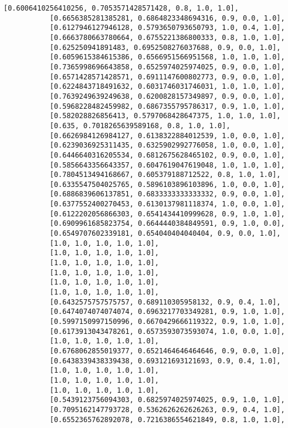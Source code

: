 \documentclass[11pt]{article}
\begin{document}
\begin{Verbatim}[commandchars=\\\{\}]
           [0.6006410256410256, 0.7053571428571428, 0.8, 1.0, 1.0],
           [0.6656385281385281, 0.6864823348694316, 0.9, 0.0, 1.0],
           [0.6127946127946128, 0.5793650793650793, 1.0, 0.4, 1.0],
           [0.6663780663780664, 0.6755221386800333, 0.8, 1.0, 1.0],
           [0.625250941891483, 0.6952508276037688, 0.9, 0.0, 1.0],
           [0.6059615384615386, 0.6566951566951568, 1.0, 1.0, 1.0],
           [0.7365998696643858, 0.6525974025974025, 0.9, 0.0, 1.0],
           [0.6571428571428571, 0.6911147600802773, 0.9, 0.0, 1.0],
           [0.6224843718491632, 0.6031746031746031, 1.0, 1.0, 1.0],
           [0.7639249639249638, 0.6200828157349897, 0.9, 0.0, 1.0],
           [0.5968228482459982, 0.6867355795786317, 0.9, 1.0, 1.0],
           [0.582028826856413, 0.5797068428647375, 1.0, 1.0, 1.0],
           [0.635, 0.7018265639589168, 0.8, 1.0, 1.0],
           [0.6626984126984127, 0.6138322884012539, 1.0, 0.0, 1.0],
           [0.6239036925311435, 0.6325902992776058, 1.0, 0.0, 1.0],
           [0.6446640316205534, 0.6812675628465102, 0.9, 0.0, 1.0],
           [0.5856643356643357, 0.6047619047619048, 1.0, 1.0, 1.0],
           [0.7804513494168667, 0.605379188712522, 0.8, 1.0, 1.0],
           [0.6335547504025765, 0.5896103896103896, 1.0, 0.0, 1.0],
           [0.6886839606137851, 0.6833333333333332, 0.9, 0.0, 1.0],
           [0.6377552400270453, 0.6130137981118374, 1.0, 0.0, 1.0],
           [0.6122202056866303, 0.6541434410999628, 0.9, 1.0, 1.0],
           [0.6909961685823754, 0.6644440384849591, 0.9, 1.0, 0.0],
           [0.6549707602339181, 0.654040404040404, 0.9, 0.0, 1.0],
           [1.0, 1.0, 1.0, 1.0, 1.0],
           [1.0, 1.0, 1.0, 1.0, 1.0],
           [1.0, 1.0, 1.0, 1.0, 1.0],
           [1.0, 1.0, 1.0, 1.0, 1.0],
           [1.0, 1.0, 1.0, 1.0, 1.0],
           [1.0, 1.0, 1.0, 1.0, 1.0],
           [0.6432575757575757, 0.689110305958132, 0.9, 0.4, 1.0],
           [0.6474074074074074, 0.6963217703349281, 0.9, 1.0, 1.0],
           [0.5997150997150996, 0.6670429666119322, 0.9, 1.0, 1.0],
           [0.6173913043478261, 0.6573593073593074, 1.0, 0.0, 1.0],
           [1.0, 1.0, 1.0, 1.0, 1.0],
           [0.6768062855019377, 0.6521464646464646, 0.9, 0.0, 1.0],
           [0.6438339438339438, 0.693121693121693, 0.9, 0.4, 1.0],
           [1.0, 1.0, 1.0, 1.0, 1.0],
           [1.0, 1.0, 1.0, 1.0, 1.0],
           [1.0, 1.0, 1.0, 1.0, 1.0],
           [0.5439123756094303, 0.6825974025974025, 0.9, 1.0, 1.0],
           [0.7095162147793728, 0.5362626262626263, 0.9, 0.4, 1.0],
           [0.6552365762892078, 0.7216386554621849, 0.8, 1.0, 1.0],

\end{Verbatim}
\end{document}
